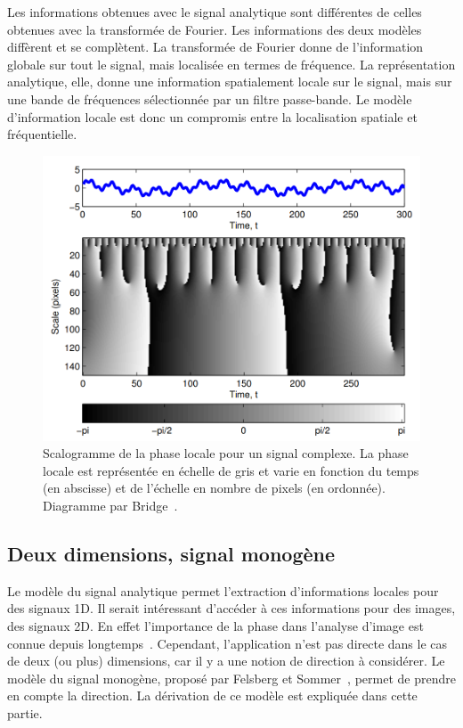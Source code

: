 \bigskip

Les informations obtenues avec le signal analytique sont différentes de celles obtenues avec la transformée de Fourier. Les informations des deux modèles diffèrent et se complètent. La transformée de Fourier donne de l'information globale sur tout le signal, mais localisée en termes de fréquence. La représentation analytique, elle, donne une information spatialement locale sur le signal, mais sur une bande de fréquences sélectionnée par un filtre passe-bande. Le modèle d'information locale est donc un compromis entre la localisation spatiale et fréquentielle.

\begin{figure}
    \centering
    \includegraphics[width=\textwidth]{contenu/resources/images/scalogram}
    \caption[Scalogramme de la phase locale]{Scalogramme de la phase locale pour un signal complexe. La phase locale est représentée en échelle de gris et varie en fonction du temps (en abscisse) et de l'échelle en nombre de pixels (en ordonnée). Diagramme par Bridge~\cite{bridge_introduction_2018}.}
    \label{fig:scalogram}
\end{figure}

\subsection{Deux dimensions, signal monogène}

Le modèle du signal analytique permet l'extraction d'informations locales pour des signaux 1D. Il serait intéressant d'accéder à ces informations pour des images, des signaux 2D. En effet l'importance de la phase dans l'analyse d'image est connue depuis longtemps~\cite{oppenheim_importance_1981}. Cependant, l'application n'est pas directe dans le cas de deux (ou plus) dimensions, car il y a une notion de direction à considérer. Le modèle du signal monogène, proposé par Felsberg et Sommer~\cite{felsberg_monogenic_2001}, permet de prendre en compte la direction. La dérivation de ce modèle est expliquée dans cette partie.

